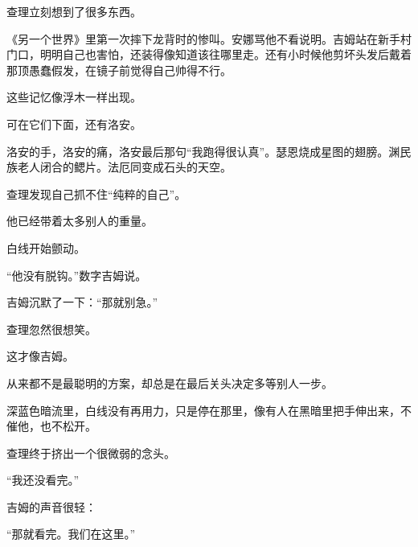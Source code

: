 查理立刻想到了很多东西。

《另一个世界》里第一次摔下龙背时的惨叫。安娜骂他不看说明。吉姆站在新手村门口，明明自己也害怕，还装得像知道该往哪里走。还有小时候他剪坏头发后戴着那顶愚蠢假发，在镜子前觉得自己帅得不行。

这些记忆像浮木一样出现。

可在它们下面，还有洛安。

洛安的手，洛安的痛，洛安最后那句“我跑得很认真”。瑟恩烧成星图的翅膀。渊民族老人闭合的鳃片。法厄同变成石头的天空。

查理发现自己抓不住“纯粹的自己”。

他已经带着太多别人的重量。

白线开始颤动。

“他没有脱钩。”数字吉姆说。

吉姆沉默了一下：“那就别急。”

查理忽然很想笑。

这才像吉姆。

从来都不是最聪明的方案，却总是在最后关头决定多等别人一步。

深蓝色暗流里，白线没有再用力，只是停在那里，像有人在黑暗里把手伸出来，不催他，也不松开。

查理终于挤出一个很微弱的念头。

“我还没看完。”

吉姆的声音很轻：

“那就看完。我们在这里。”

